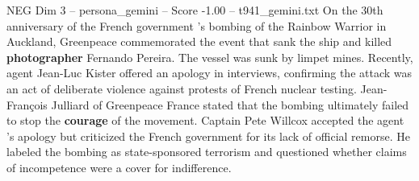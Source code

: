 \begin{textsample}{NEG Dim 3 – persona\_gemini – Score -1.00 – t941\_gemini.txt}  \label{ex:f3_neg_007}
On the 30th anniversary of the French government 's bombing of the Rainbow Warrior in Auckland, Greenpeace commemorated the event that sank the ship and killed \textbf{photographer} Fernando Pereira.
The vessel was sunk by limpet mines.
Recently, agent Jean-Luc Kister offered an apology in interviews, confirming the attack was an act of deliberate violence against protests of French nuclear testing.
Jean-François Julliard of Greenpeace France stated that the bombing ultimately failed to stop the \textbf{courage} of the movement.
Captain Pete Willcox accepted the agent 's apology but criticized the French government for its lack of official remorse.
He labeled the bombing as state-sponsored terrorism and questioned whether claims of incompetence were a cover for indifference.

\end{textsample}
